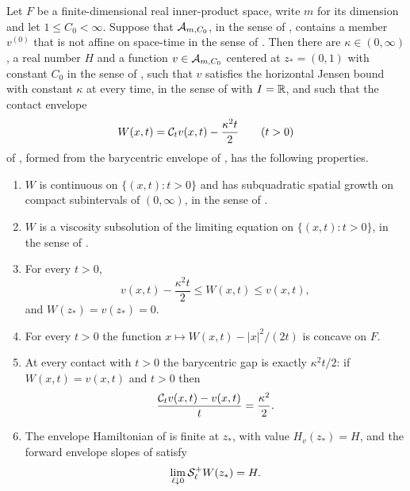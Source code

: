 \begin{theorem}
Let $F$ be a finite-dimensional real inner-product space, write $m$ for its
dimension and let $1\le C_0<\infty$. Suppose that $\mathcal{A}_{m,C_0}$, in the
sense of , contains a member $v^{(0)}$ that is not affine on
space-time in the sense of . Then there are
$\kappa\in(0,\infty)$, a real number $H$ and a function $v\in\mathcal{A}_{m,C_0}$
centered at $z_*=(0,1)$ with constant $C_0$ in the sense of
, such that $v$ satisfies the horizontal Jensen bound with
constant $\kappa$ at every time, in the sense of  with
$I=\mathbb{R}$, and such that the contact envelope
\[
  W(x,t)=\mathcal{C}_tv(x,t)-\frac{\kappa^2t}{2}\qquad(t>0)
\]
of , formed from the barycentric envelope of
, has the following properties.
\begin{enumerate}
\item $W$ is continuous on $\{(x,t):t>0\}$ and has subquadratic spatial growth
on compact subintervals of $(0,\infty)$, in the sense of
.
\item $W$ is a viscosity subsolution of the limiting equation on
$\{(x,t):t>0\}$, in the sense of .
\item For every $t>0$,
\[
  v(x,t)-\frac{\kappa^2t}{2}\le W(x,t)\le v(x,t),
\]
and $W(z_*)=v(z_*)=0$.
\item For every $t>0$ the function $x\mapsto W(x,t)-|x|^2/(2t)$ is concave on
$F$.
\item At every contact with $t>0$ the barycentric gap is exactly
$\kappa^2t/2$: if $W(x,t)=v(x,t)$ and $t>0$ then
\[
  \frac{\mathcal{C}_tv(x,t)-v(x,t)}{t}=\frac{\kappa^2}{2}.
\]
\item The envelope Hamiltonian of  is finite at $z_*$,
with value $H_v(z_*)=H$, and the forward envelope slopes of
 satisfy
\[
  \lim_{\ell\downarrow0}\mathcal{S}_\ell^+W(z_*)=H .
\]
\end{enumerate}
\end{theorem}
